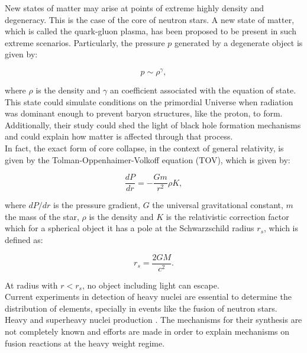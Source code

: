 \documentclass[openany]{book}
\begin{document}
New states of matter may arise at points of extreme highly density and degeneracy. This is the case of the core of neutron stars. A new state of matter, which is called the quark-gluon plasma, has been proposed to be present in such extreme scenarios. Particularly, the pressure $p$ generated  by a degenerate object is given by: 

\begin{equation}\label{eq:reaction_degenerate}
	p \sim \rho^{\gamma},
\end{equation} 

where $\rho$ is the density and $\gamma$ an coefficient associated with the equation of state.  \\

This state could simulate conditions on the primordial Universe when radiation was dominant enough to prevent baryon structures, like the proton, to form. Additionally, their study could shed the light of black hole formation mechanisms and could explain how matter is affected through that process. \\

In fact, the exact form of core collapse, in the context of general relativity, is given by the Tolman-Oppenhaimer-Volkoff equation (TOV), which is given by: 

\begin{equation}\label{eq:reaction_TOV}
	\frac{dP}{dr} = - \frac{Gm}{r^2} \rho  K,
\end{equation} 

where $dP/dr$ is the pressure gradient, $G$ the universal gravitational constant, $m$ the mass of the star, $\rho$ is the density and $K$ is the relativistic correction factor which for a spherical object it has a pole at the Schwarzschild radius $r_s$, which is defined as: 

\begin{equation}\label{eq:reaction_SchwarzschildRadius}
	r_s = \frac{2GM}{c^2}.
\end{equation}

At radius with $r < r_s$, no object including light can escape. \\ 

Current experiments in detection of heavy nuclei are essential to determine the distribution of elements, specially in events like the fusion of neutron stars. \\ 

Heavy and superheavy nuclei production \cite{adamian_antonenko_2022}. The mechanisms for their synthesis are not completely known and efforts are made in order to explain mechanisms on fusion reactions at the heavy weight regime.  \\
\end{document}
